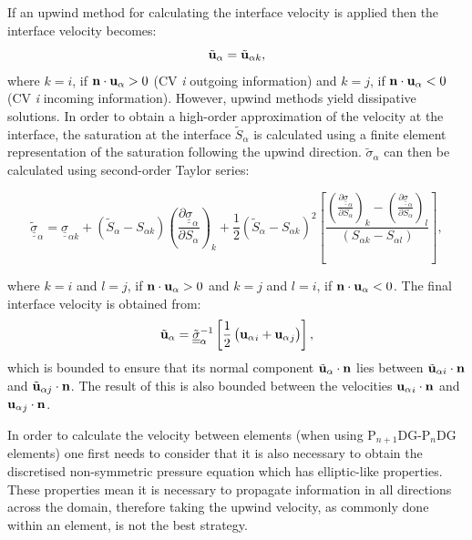 \documentclass[times]{fldauth}
\newcommand{\frc}{\displaystyle\frac}
\begin{document}
If an upwind method for calculating the interface velocity is applied
then the interface velocity becomes:
\begin{equation}
  {\tilde{\bf u}}_{\alpha} = \tilde{\bf u}_{\alpha k},
\end{equation}
where $k=i$, if ${\bf n}\cdot{\bf u}_{\alpha}>0$ (CV {\it i} outgoing
information) and $k=j$, if ${\bf n}\cdot{\bf u}_{\alpha}<0$ (CV {\it
  i} incoming information). However, upwind methods yield dissipative
solutions. In order to obtain a high-order approximation of the
velocity at the interface, the saturation at the interface
$\tilde{S}_{\alpha}$ is calculated using a finite element
representation of the saturation following the upwind direction.
$\tilde \sigma_{\alpha}$ can then be calculated using second-order
Taylor series:
\begin{small}
\begin{equation}
  \underline{\underline{\tilde{\sigma}}}_{\alpha} =
  \underline{\underline{\sigma}}_{\alpha k} +
  \left(\tilde{S}_{\alpha}-S_{\alpha k}\right) \left(\frc{\partial
    \underline{\underline{\sigma}}_{\alpha}}{\partial
    S_{\alpha}}\right)_{k} +
  \frc{1}{2}\left(\tilde{S}_{\alpha}-S_{\alpha k}\right)^{2} \left[
    \frc{ \left(\frc{\partial
        \underline{\underline{\sigma}}_{\alpha}}{\partial
        S_{\alpha}}\right)_{k} - \left(\frc{\partial
        \underline{\underline{\sigma}}_{\alpha}}{\partial
        S_{\alpha}}\right)_{l} } { \left(S_{\alpha k}-S_{\alpha
        l}\right) } \right],
  \label{sigma-out}
\end{equation}
\end{small}
where $k=i$ and $l=j$, if ${\bf n}\cdot{\bf u}_{\alpha}>0$ and $k=j$
and $l=i$, if ${\bf n}\cdot{\bf u}_{\alpha}<0$. The final interface
velocity is obtained from:
\begin{equation}
  {\tilde{\bf u}_{\alpha}} =
  \underline{\underline{\tilde{\sigma}}}_{\alpha}^{-1}
  \left[\displaystyle\frac{1}{2} \left( {{\bf u}_\alpha}_i + {{\bf
        u}_\alpha}_j \right)\right],
  \label{mean_int_vel}  
\end{equation} 
which is bounded to ensure that its normal component ${\tilde{\bf
    u}_\alpha}\cdot {\bf n}$ lies between ${\tilde{\bf u}_{\alpha
    i}}\cdot {\bf n}$ and ${\tilde{\bf u}_{\alpha j}}\cdot {\bf
  n}$. The result of this is also bounded between the velocities
${{\bf u}_\alpha}_i\cdot {\bf n}$ and ${{\bf u}_\alpha}_j\cdot {\bf
  n}$.

In order to calculate the velocity between elements (when using
P$_{n+1}$DG-P$_{n}$DG elements) one first needs to consider that it is
also necessary to obtain the discretised non-symmetric pressure
equation which has elliptic-like properties. These properties mean it
is necessary to propagate information in all directions across the
domain, therefore taking the upwind velocity, as commonly done within
an element, is not the best strategy.
 
\end{document}
